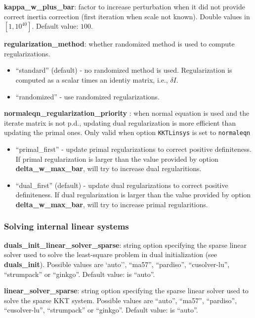 \noindent \textbf{kappa\_w\_plus\_bar}: factor to increase perturbation when it did not provide correct inertia correction (first iteration when scale not known). Double values in $[1, 10^{40}]$. Default value: $100$.
\medskip

\noindent \textbf{regularization\_method}: whether randomized method is used to compute regularizations.
\begin{itemize}
\item ``standard'' (default) - no randomized method is used. Regularization is computed as a scalar times an identiy matrix, i.e., $\delta I$.
\item ``randomized'' - use randomized regularizations.
\end{itemize}
\medskip

\noindent \textbf{normaleqn\_regularization\_priority }: when normal equation is used and the iterate matrix is not p.d., updating dual regularization is more efficient than updating the primal ones. Only valid when option \texttt{KKTLinsys} is set to \texttt{normaleqn}
\begin{itemize}
\item ``primal\_first'' - update primal regularizations to correct positive definiteness. If primal regularization is larger than the value provided by option \textbf{delta\_w\_max\_bar}, \Hi will try to increase dual regularitions. 
\item ``dual\_first'' (default) - update dual regularizations to correct positive definiteness. If dual regularization is larger than the value provided by option \textbf{delta\_w\_max\_bar}, \Hi will try to increase primal regularitions. 
\end{itemize}
\medskip



\subsubsection{Solving internal linear systems}

\noindent \textbf{duals\_init\_linear\_solver\_sparse}: string option specifying the sparse linear solver used to solve the least-square problem in dual initialization (see \textbf{duals\_init}). Possible values are `auto'', ``ma57'', ``pardiso'', ``cusolver-lu'', ``strumpack'' or ``ginkgo''. Default value: is ``auto''.
\medskip

\noindent \textbf{linear\_solver\_sparse}: string option specifying the sparse linear solver used to solve the sparse KKT system. Possible values are ``auto'', ``ma57'', ``pardiso'', ``cusolver-lu'', ``strumpack'' or ``ginkgo''. Default value: is ``auto''.
\medskip

